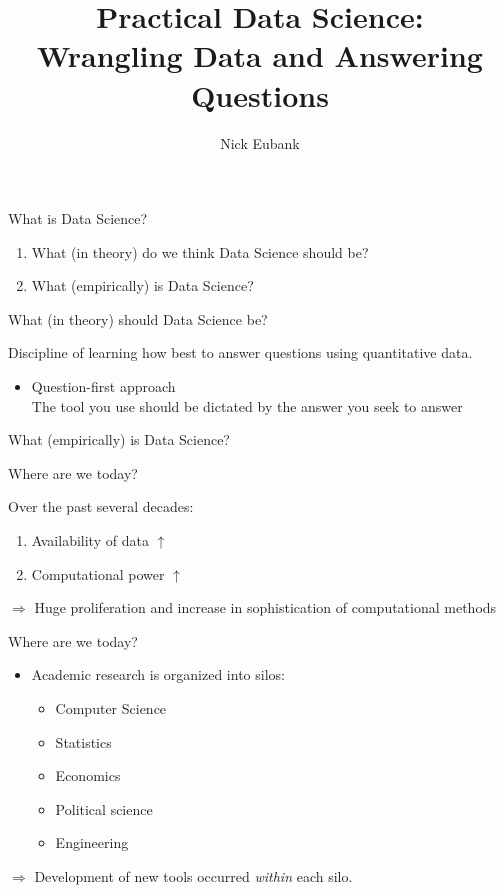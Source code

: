\documentclass[11pt]{beamer}
\title{Practical Data Science: \\ Wrangling Data and Answering Questions}
\author{\small Nick Eubank}
\date{\vspace*{.3in} \date}
\begin{document}
\begin{frame}
\maketitle
\end{frame}


\begin{frame}[c]{What is Data Science?}
\begin{enumerate}
	\pause \item What (\alert{in theory}) do we think Data Science should be?
	\pause \item What (\alert{empirically}) is Data Science?
\end{enumerate}
\end{frame}


\begin{frame}[c]{What (in theory) should Data Science be?}

\pause Discipline of learning how best to \alert{answer questions} using \alert{quantitative data.}

\pause
\begin{itemize}
	\item Question-first approach \\
	\pause The tool you use should be dictated by the answer you seek to answer
\end{itemize}

\end{frame}

\begin{frame}[c]{What (empirically) is Data Science?}

\end{frame}

\begin{frame}[c]{Where are we today?}

Over the past several decades:
\begin{enumerate}
	\item Availability of data $\uparrow$
	\item Computational power $\uparrow$
\end{enumerate}
\pause
$\Rightarrow$ Huge proliferation and increase in sophistication of computational methods
\end{frame}


\begin{frame}[c]{Where are we today?}

\begin{itemize}
	\item Academic research is organized into silos:
	\pause
	\begin{itemize}
		\item Computer Science
		\item Statistics
		\item Economics
		\item Political science
		\item Engineering
	\end{itemize}
\end{itemize}
$\Rightarrow$ Development of new tools occurred \emph{within} each silo.
\end{frame}
\end{document}
